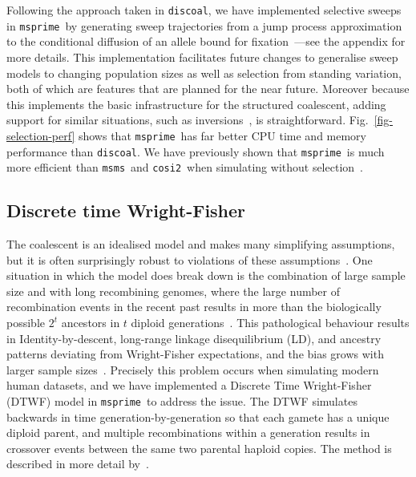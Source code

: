 \documentclass{article}
\newcommand{\msprime}[0]{\texttt{msprime}}
\newcommand{\msms}[0]{\texttt{msms}}
\newcommand{\cosiTwo}[0]{\texttt{cosi2}}
\newcommand{\discoal}[0]{\texttt{discoal}}
\begin{document}
Following the approach taken in \discoal, we
have implemented selective sweeps in \msprime\ by generating
sweep trajectories from a jump process approximation to the conditional diffusion
of an allele bound for
fixation~\citep{coop2004ancestral}---see the appendix for more details.
This implementation facilitates future changes to generalise sweep models to
changing population sizes as well as selection from standing variation,
both of which are features that are planned for the near future.
Moreover because this implements the basic infrastructure for the structured
coalescent, adding support for similar situations,
such as inversions~\citep{peischl2013sequential}, is straightforward.
Fig.~\ref{fig-selection-perf} shows that \msprime\ has far better
CPU time and memory performance than \discoal. We have previously shown
that \msprime\ is much more efficient than \msms\ and \cosiTwo\
when simulating without selection~\citep{kelleher2016efficient}.

\subsection*{Discrete time Wright-Fisher}
The coalescent is an idealised model and makes many simplifying assumptions,
but it is often surprisingly robust to violations of these
assumptions~\citep{wakeley2012gene}. One situation in which the
model does break down is the combination of large sample size
and with long recombining genomes, where the large
number of recombination events in the recent past results in
more than the biologically possible $2^t$ ancestors in
$t$ diploid generations~\citep{nelson2020accounting}.
This pathological behaviour results in
Identity-by-descent,
long-range linkage disequilibrium (LD), and ancestry patterns deviating from
Wright-Fisher expectations, and the bias grows with larger sample
sizes~\citep{wakeley2012gene,bhaskar2014distortion,nelson2020accounting}.
Precisely this problem occurs when simulating modern human datasets,
and we have implemented a Discrete Time Wright-Fisher (DTWF) model
in \msprime\ to address the issue. The DTWF simulates backwards in
time generation-by-generation so that each gamete has a unique
diploid parent, and multiple recombinations within a generation results in
crossover events between the same two parental haploid copies.
The method is described in more detail by~\cite{nelson2020accounting}.
\end{document}

